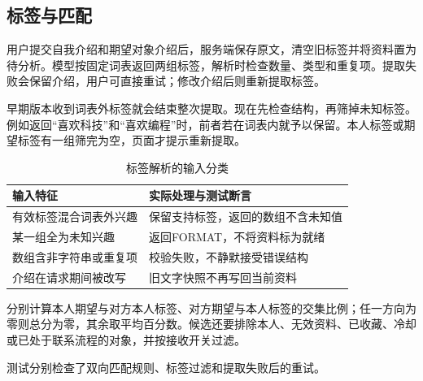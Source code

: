 \subsection*{标签与匹配}
用户提交自我介绍和期望对象介绍后，服务端保存原文，清空旧标签并将资料置为待分析。模型按固定词表返回两组标签，解析时检查数量、类型和重复项。提取失败会保留介绍，用户可直接重试；修改介绍后则重新提取标签。

早期版本收到词表外标签就会结束整次提取。现在先检查结构，再筛掉未知标签。例如返回“喜欢科技”和“喜欢编程”时，前者若在词表内就予以保留。本人标签或期望标签有一组筛完为空，页面才提示重新提取。

\begin{table}[H]\centering\small
\caption{标签解析的输入分类}
\begin{tabularx}{\linewidth}{@{}p{45mm}X@{}}\toprule
输入特征 & 实际处理与测试断言 \\ \midrule
有效标签混合词表外兴趣 & 保留支持标签，返回的数组不含未知值 \\
某一组全为未知兴趣 & 返回FORMAT，不将资料标为就绪 \\
数组含非字符串或重复项 & 校验失败，不静默接受错误结构 \\
介绍在请求期间被改写 & 旧文字快照不再写回当前资料 \\ \bottomrule
\end{tabularx}\end{table}

分别计算本人期望与对方本人标签、对方期望与本人标签的交集比例；任一方向为零则总分为零，其余取平均百分数。候选还要排除本人、无效资料、已收藏、冷却或已处于联系流程的对象，并按接收开关过滤。

测试分别检查了双向匹配规则、标签过滤和提取失败后的重试。
